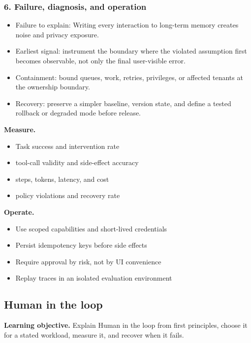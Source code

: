 \subsubsection*{6. Failure, diagnosis, and operation}
\begin{itemize}
\item Failure to explain: Writing every interaction to long-term memory creates noise and privacy exposure.
\item Earliest signal: instrument the boundary where the violated assumption first becomes observable, not only the final user-visible error.
\item Containment: bound queues, work, retries, privileges, or affected tenants at the ownership boundary.
\item Recovery: preserve a simpler baseline, version state, and define a tested rollback or degraded mode before release.
\end{itemize}
\textbf{Measure.}\begin{itemize}
\item Task success and intervention rate
\item tool-call validity and side-effect accuracy
\item steps, tokens, latency, and cost
\item policy violations and recovery rate
\end{itemize}
\textbf{Operate.}\begin{itemize}
\item Use scoped capabilities and short-lived credentials
\item Persist idempotency keys before side effects
\item Require approval by risk, not by UI convenience
\item Replay traces in an isolated evaluation environment
\end{itemize}
\subsection{Human in the loop}
\textbf{Learning objective.} Explain Human in the loop from first principles, choose it for a stated workload, measure it, and recover when it fails.
